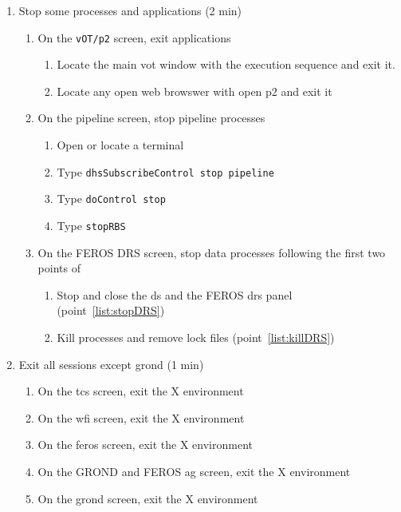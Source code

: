 \documentclass[11pt,fleqn,a4paper]{book}
\begin{document}
\label{proc:monthly}
\begin{enumerate}
\item \label{list:soft:stop} Stop some processes and applications (2 min)
  \begin{enumerate}
     \item On the \texttt{vOT/p2} screen, exit applications
     \begin{enumerate}
      \item Locate the main \gls{vot} window with the execution sequence and exit it.
      \item Locate any open web browswer with open \gls{p2} and exit it
     \end{enumerate}
     \item On the pipeline screen, stop pipeline processes
             \begin{enumerate}
                \item Open or locate a terminal
                \item Type \texttt{dhsSubscribeControl stop pipeline}
                \item Type \texttt{doControl stop}
                \item Type \texttt{stopRBS}
             \end{enumerate}
     \item On the FEROS DRS screen, stop data processes following the first two points of 
             \begin{enumerate}
                \item Stop and close the \gls{ds} and the FEROS \gls{drs} panel (point~\ref{list:stopDRS})
                \item Kill processes and remove lock files (point~\ref{list:killDRS})
             \end{enumerate}
   \end{enumerate}
\item \label{list:soft:exit} Exit all sessions except \gls{grond} (1 min)
    \begin{enumerate}
        \item On the \gls{tcs} screen, exit the X environment
        \item On the \gls{wfi} screen, exit the X environment
        \item On the \gls{feros} screen, exit the X environment
        \item On the GROND and FEROS \gls{ag} screen, exit the X environment
        \item On the \gls{grond} screen, exit the X environment

\end{enumerate}
\end{enumerate}
\end{document}
